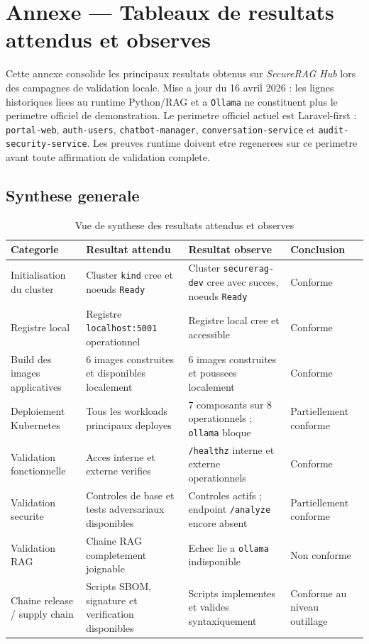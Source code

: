 \appendix
\section{Annexe --- Tableaux de resultats attendus et observes}
\label{sec:annexe-resultats-validation}

Cette annexe consolide les principaux resultats obtenus sur \textit{SecureRAG Hub} lors des campagnes de validation locale. Mise a jour du 16 avril 2026 : les lignes historiques liees au runtime Python/RAG et a \texttt{Ollama} ne constituent plus le perimetre officiel de demonstration. Le perimetre officiel actuel est Laravel-first : \texttt{portal-web}, \texttt{auth-users}, \texttt{chatbot-manager}, \texttt{conversation-service} et \texttt{audit-security-service}. Les preuves runtime doivent etre regenerees sur ce perimetre avant toute affirmation de validation complete.

\subsection{Synthese generale}

\begin{table}[h]
\centering
\begin{tabular}{|p{3.6cm}|p{3.8cm}|p{4.0cm}|p{3.4cm}|}
\hline
\textbf{Categorie} & \textbf{Resultat attendu} & \textbf{Resultat observe} & \textbf{Conclusion} \\
\hline
Initialisation du cluster & Cluster \texttt{kind} cree et noeuds \texttt{Ready} & Cluster \texttt{securerag-dev} cree avec succes, noeuds \texttt{Ready} & Conforme \\
\hline
Registre local & Registre \texttt{localhost:5001} operationnel & Registre local cree et accessible & Conforme \\
\hline
Build des images applicatives & 6 images construites et disponibles localement & 6 images construites et poussees localement & Conforme \\
\hline
Deploiement Kubernetes & Tous les workloads principaux deployes & 7 composants sur 8 operationnels ; \texttt{ollama} bloque & Partiellement conforme \\
\hline
Validation fonctionnelle & Acces interne et externe verifies & \texttt{/healthz} interne et externe operationnels & Conforme \\
\hline
Validation securite & Controles de base et tests adversariaux disponibles & Controles actifs ; endpoint \texttt{/analyze} encore absent & Partiellement conforme \\
\hline
Validation RAG & Chaine RAG completement joignable & Echec lie a \texttt{ollama} indisponible & Non conforme \\
\hline
Chaine release / supply chain & Scripts SBOM, signature et verification disponibles & Scripts implementes et valides syntaxiquement & Conforme au niveau outillage \\
\hline
\end{tabular}
\caption{Vue de synthese des resultats attendus et observes}
\end{table}

